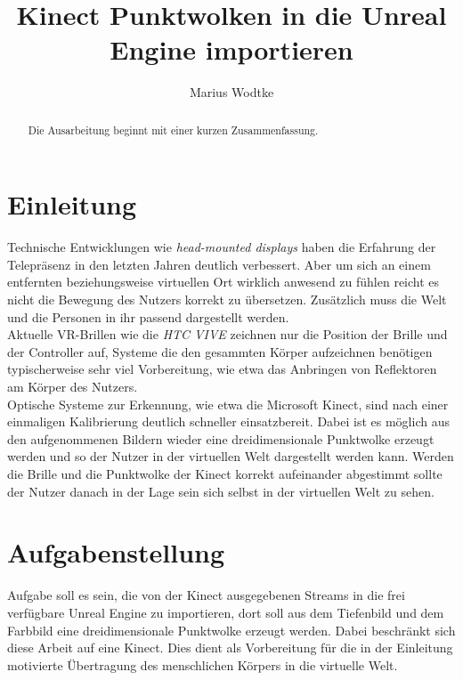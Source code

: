 \documentclass[a4paper]{IEEEtran}
\title{Kinect Punktwolken in die Unreal Engine importieren}
\author{Marius Wodtke}
\begin{document}
\maketitle

\begin{abstract}
Die Ausarbeitung beginnt mit einer kurzen Zusammenfassung.
\end{abstract}

\section{Einleitung}
	Technische Entwicklungen wie {\textit{head-mounted displays}} haben die Erfahrung der Telepräsenz in den letzten Jahren deutlich verbessert. 
	Aber um sich an einem entfernten beziehungsweise virtuellen Ort wirklich anwesend zu fühlen reicht es nicht die Bewegung des Nutzers korrekt zu übersetzen. 
	Zusätzlich muss die Welt und die Personen in ihr passend dargestellt werden. \\
	Aktuelle VR-Brillen wie die \textit{HTC VIVE} zeichnen nur die Position der Brille und der Controller auf, Systeme die den gesammten Körper aufzeichnen benötigen typischerweise sehr viel Vorbereitung, wie etwa das Anbringen von Reflektoren am Körper des Nutzers. \\
	Optische Systeme zur Erkennung, wie etwa die Microsoft Kinect, sind nach einer einmaligen Kalibrierung deutlich schneller einsatzbereit. 
	Dabei ist es möglich aus den aufgenommenen Bildern wieder eine dreidimensionale Punktwolke erzeugt werden und so der Nutzer in der virtuellen Welt dargestellt werden kann. 
	Werden die Brille und die Punktwolke der Kinect korrekt aufeinander abgestimmt sollte der Nutzer danach in der Lage sein sich selbst in der virtuellen Welt zu sehen.\\


\section{Aufgabenstellung}
	Aufgabe soll es sein, die von der Kinect ausgegebenen Streams in die frei verfügbare Unreal Engine zu importieren, dort soll aus dem Tiefenbild und dem Farbbild eine dreidimensionale Punktwolke erzeugt werden. 
	Dabei beschränkt sich diese Arbeit auf eine Kinect. 
	Dies dient als Vorbereitung für die in der Einleitung motivierte Übertragung des menschlichen Körpers in die virtuelle Welt. \\
\end{document}
